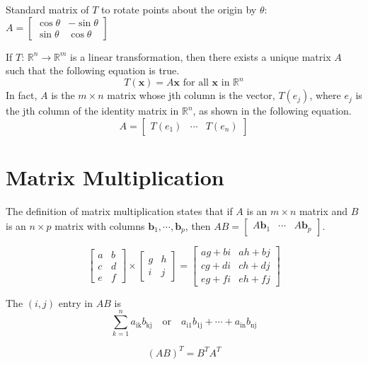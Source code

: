 \documentclass{article}
\begin{document}
Standard matrix of $T$ to rotate points about the origin by $\theta$:
$A=\begin{bmatrix}
    \cos\theta & -\sin\theta \\
    \sin\theta & \cos\theta
\end{bmatrix}$

If $T$: $\mathbb{R}^n\rightarrow\mathbb{R}^m$ is a linear transformation, then there exists a
unique matrix $A$ such that the following equation is true.
\[T(\mathbf{x})=A\mathbf{x}\text{ for all }\mathbf{x}\text{ in }\mathbb{R}^n\]
In fact, $A$ is the $m\times n$ matrix whose jth column is the vector, $T(e_j)$, where $e_j$ is the
jth column of the identity matrix in $\mathbb{R}^n$, as shown in the following equation.
\[A=\begin{bmatrix}
    T(e_1) & \cdots & T(e_n) 
\end{bmatrix}\]

\section*{Matrix Multiplication}
The definition of matrix multiplication states that if $A$ is an $m\times n$ matrix and $B$ is an $n\times p$ matrix with columns $\mathbf{b}_1, \cdots , \mathbf{b}_p$, then $AB=\begin{bmatrix} A\mathbf{b}_1 & \cdots & A\mathbf{b}_p \end{bmatrix}$.

\[
\begin{bmatrix}
    a & b \\
    c & d \\
    e & f
\end{bmatrix}
\times
\begin{bmatrix}
    g & h \\
    i & j
\end{bmatrix}
=
\begin{bmatrix}
    ag+bi & ah+bj \\
    cg+di & ch+dj \\
    eg+fi & eh+fj
\end{bmatrix}
\]

The $(i, j)$ entry in $AB$ is
\[\sum_{k=1}^n a_{\text{ik}}b_{\text{kj}}\quad \text{or} \quad a_{\text{i1}}b_{\text{1j}}+\cdots + a_{\text{in}}b_{\text{nj}}\]

\[{(AB)}^T=B^T A^T\]
\end{document}
